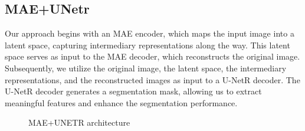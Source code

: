 \subsection{MAE+UNetr}
Our approach begins with an MAE encoder, which maps the input image into a latent space, capturing intermediary representations along the way. This latent space serves as input to the MAE decoder, which reconstructs the original image. Subsequently, we utilize the original image, the latent space, the intermediary representations, and the reconstructed images as input to a U-NetR decoder. The U-NetR decoder generates a segmentation mask, allowing us to extract meaningful features and enhance the segmentation performance.

\begin{figure}[H]
    \centering
    
    \caption{MAE+UNETR architecture}
    \label{fig:complete-arch}
\end{figure}

